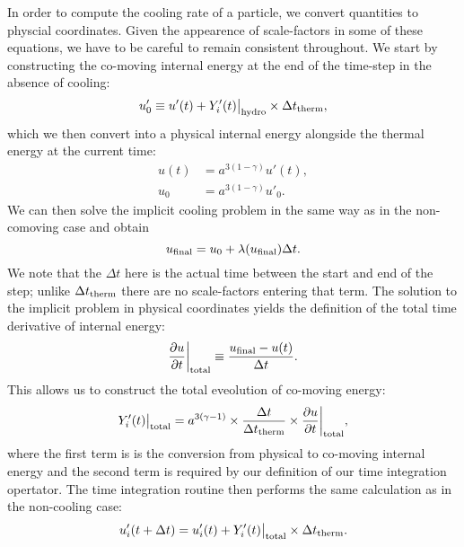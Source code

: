\documentclass[fleqn, usenatbib, useAMS, a4paper]{mnras}
\begin{document}
In order to compute the
cooling rate of a particle, we convert quantities to physcial
coordinates. Given the appearence of scale-factors in some of these
equations, we have to be careful to remain consistent throughout. We
start by constructing the co-moving internal energy at the end of the
time-step in the absence of cooling:
\begin{equation}
  u'_0 \equiv u'(t) + Y'_i(t)\big|_{\rm hydro} \times \Delta t_{\rm therm},
\end{equation}
which we then convert into a physical internal energy alongside the
thermal energy at the current time:
\begin{align}
  u(t) &= a^{3(1-\gamma)}u'(t),\\
  u_0 &= a^{3(1-\gamma)}u'_0.
\end{align}
We can then solve the implicit cooling problem in the same way as in
the non-comoving case and obtain
\begin{equation}
  u_{\rm final} = u_0 + \lambda(u_{\rm final}) \Delta t.
\end{equation}
We note that the $\Delta t$ here is the actual time between the start
and end of the step; unlike $\Delta t_{\rm therm}$ there are no
scale-factors entering that term. The solution to the implicit problem
in physical coordinates yields the definition of the total time
derivative of internal energy:
\begin{equation}
  \frac{\partial u}{\partial t}\bigg|_{\rm total} \equiv \frac{u_{\rm final} -
    u(t)}{\Delta t}.
\end{equation}
This allows us to construct the total eveolution of co-moving energy:
\begin{equation}
  Y'_i(t)\big|_{\rm total} = a^{3(\gamma-1)} \times \frac{\Delta t}{\Delta
    t_{\rm therm}} \times
  \frac{\partial u}{\partial t}\bigg|_{\rm total},
\end{equation}
where the first term is is the conversion from physical to co-moving
internal energy and the second term is required by our definition of
our time integration opertator. The time integration routine then performs the
same calculation as in the non-cooling case:
\begin{equation}
  u'_i(t+\Delta t) = u'_i(t) + Y'_i(t)\big|_{\rm total} \times {\Delta t_{\rm therm}}.
\end{equation}
\end{document}
